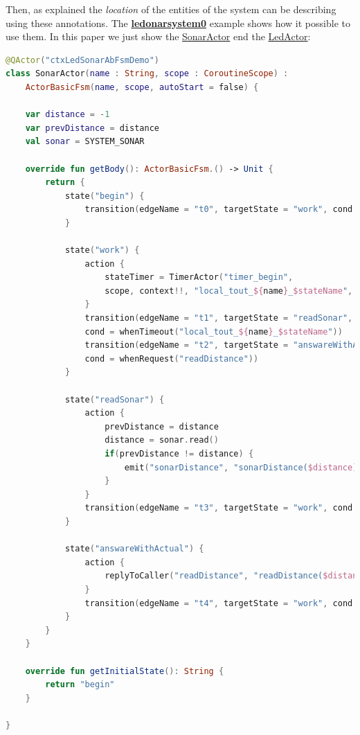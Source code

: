 Then, as explained the \textit{location} of the entities of the system can be describing using these annotations. The \href{https://github.com/LM-96/QA-Extensions/tree/main/it.unibo.ledsonardemo0}{\textcolor{Emerald}{\textbf{ledonarsystem0}}} example shows how it possible to use them.
In this paper we just show the \href{https://github.com/LM-96/QA-Extensions/blob/main/it.unibo.ledsonardemo0/src/main/kotlin/it/unibo/ledsonardemo0/actors/SonarActor.kt}{SonarActor} end the \href{https://github.com/LM-96/QA-Extensions/blob/main/it.unibo.ledsonardemo0/src/main/kotlin/it/unibo/ledsonardemo0/actors/LedActor.kt}{LedActor}:

\begin{lstlisting}[caption=\texttt{SonarActor} (\texttt{ledsonarsystem0}),language=Kotlin]
@QActor("ctxLedSonarAbFsmDemo")
class SonarActor(name : String, scope : CoroutineScope) :
	ActorBasicFsm(name, scope, autoStart = false) {
	
	var distance = -1
	var prevDistance = distance
	val sonar = SYSTEM_SONAR
	
	override fun getBody(): ActorBasicFsm.() -> Unit {
		return {
			state("begin") {
				transition(edgeName = "t0", targetState = "work", cond = doswitch())
			}
			
			state("work") {
				action {
					stateTimer = TimerActor("timer_begin",
					scope, context!!, "local_tout_${name}_$stateName", 2000 )
				}
				transition(edgeName = "t1", targetState = "readSonar",
				cond = whenTimeout("local_tout_${name}_$stateName"))
				transition(edgeName = "t2", targetState = "answareWithActual",
				cond = whenRequest("readDistance"))
			}
			
			state("readSonar") {
				action {
					prevDistance = distance
					distance = sonar.read()
					if(prevDistance != distance) {
						emit("sonarDistance", "sonarDistance($distance)")
					}
				}
				transition(edgeName = "t3", targetState = "work", cond = doswitch())
			}
			
			state("answareWithActual") {
				action {
					replyToCaller("readDistance", "readDistance($distance)")
				}
				transition(edgeName = "t4", targetState = "work", cond = doswitch())
			}
		}
	}
	
	override fun getInitialState(): String {
		return "begin"
	}
	
}
\end{lstlisting}

